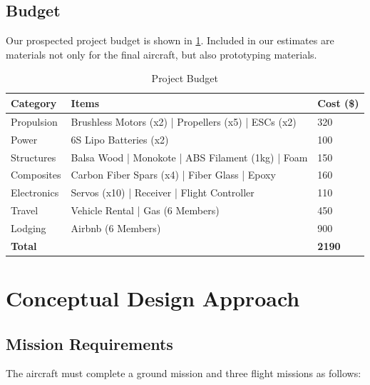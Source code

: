 \documentclass[proposal]{byu-aero}
\begin{document}


\subsection{Budget}
\label{ssec:budget}

Our prospected project budget is shown in \cref{tab:budget}. Included in our estimates are materials not only for the final aircraft, but also prototyping materials.

\begin{table}[htb!]
	\centering
	\renewcommand{\arraystretch}{1.2}
	\caption{Project Budget}
	\label{tab:budget}
	\begin{tabular}{ |l|l|l| } 
		\hline
		\rowcolor{BYUbluemid}
		Category & Items & Cost (\$) \\ 
		\hline
		Propulsion &  Brushless Motors (x2) | Propellers (x5) | ESCs (x2) & 320 \\
		\hline
		Power & 6S Lipo Batteries (x2) & 100 \\ 
		\hline
		Structures & Balsa Wood | Monokote | ABS Filament (1kg) | Foam & 150 \\ 
		\hline
		Composites & Carbon Fiber Spars (x4) | Fiber Glass | Epoxy & 160  \\ 
		\hline
		Electronics & Servos (x10) | Receiver | Flight Controller & 110 \\
		\hline
		Travel & Vehicle Rental | Gas (6 Members) & 450 \\
		\hline
		Lodging & Airbnb (6 Members) & 900 \\
		\hline 
		\textbf{Total} & & \textbf{2190} \\ 
		\hline
		
	\end{tabular}
\end{table}

\section{Conceptual Design Approach}
\label{sec:ConceptualDesign}


\subsection{Mission Requirements}
\label{ssec:missionreqs}
The aircraft must complete a ground mission and three flight missions as follows: 
\end{document}
